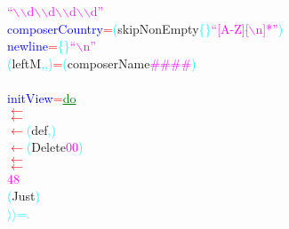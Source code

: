 \textcolor{magenta}{``$\backslash$$\backslash$d$\backslash$$\backslash$d$\backslash$$\backslash$d$\backslash$$\backslash$d''}\\\textcolor{blue}{composerCountry}\hsspace \hsspace \textcolor{red}{=}\hsspace \textcolor{cyan}{(}{\rm{}skipNonEmpty}\hsspace \textcolor{cyan}{\{}\textcolor{cyan}{\}}\hsspace \textcolor{magenta}{``[A-Z][\ensuremath{\hat{ }}$\backslash$n]*''}\textcolor{cyan}{)}\\\textcolor{blue}{newline}\hsspace \hsspace \hsspace \hsspace \hsspace \hsspace \hsspace \hsspace \hsspace \hsspace \textcolor{red}{=}\hsspace \textcolor{cyan}{\{}\textcolor{cyan}{\}}\hsspace \textcolor{magenta}{``$\backslash$n''}\\\textcolor{cyan}{(}{\rm{}leftM}\textcolor{cyan}{,}\textcolor{cyan}{,}\textcolor{cyan}{)}\hsspace \textcolor{red}{=}\hsspace \textcolor{cyan}{(}{\rm{}composerName}\hsspace \textcolor{magenta}{\#}\hsspace \textcolor{magenta}{\#}\hsspace \textcolor{magenta}{\#}\hsspace \textcolor{magenta}{\#}\textcolor{cyan}{)}\\\\\textcolor{blue}{initView}\hsspace \textcolor{red}{=}\hsspace \textcolor{green}{\underline{do}}\\\hsspace \textcolor{red}{\ensuremath{\leftarrow}}\\\hsspace \hsspace \hsspace \textcolor{red}{\ensuremath{\leftarrow}}\\\hsspace \hsspace \hsspace \textcolor{red}{\ensuremath{\leftarrow}}\hsspace \textcolor{cyan}{(}{\rm{}def}\textcolor{cyan}{,}\hsspace {\rm{}[]}\textcolor{cyan}{)}\\\hsspace \hsspace \hsspace \hsspace \textcolor{red}{\ensuremath{\leftarrow}}\hsspace \textcolor{cyan}{(}{\rm{}Delete}\hsspace \textcolor{magenta}{0}\hsspace \textcolor{magenta}{0}\textcolor{cyan}{)}\\\hsspace \hsspace \hsspace \textcolor{red}{\ensuremath{\leftarrow}}\\\hsspace \hsspace \hsspace \textcolor{red}{\ensuremath{\leftarrow}}\\\hsspace \textcolor{magenta}{48}\\\hsspace \textcolor{cyan}{(}{\rm{}Just}\textcolor{cyan}{)}\\\hsspace \textcolor{cyan}{\ensuremath{\rangle}\ensuremath{\rangle}=}\hsspace \textcolor{cyan}{.}\hsspace 